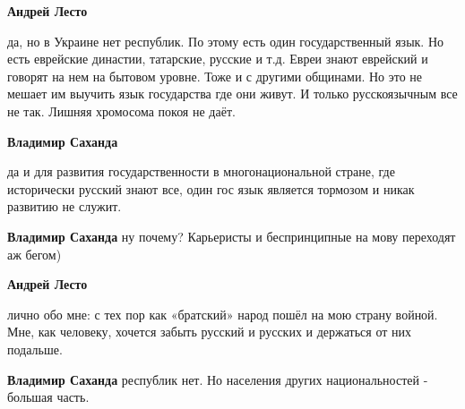 \begin{itemize}
\begin{itemize}
\textbf{Андрей Лесто} 

да, но в Украине нет республик. По этому есть один государственный язык. Но
есть еврейские династии, татарские, русские и т.д. Евреи знают еврейский и
говорят на нем на бытовом уровне. Тоже и с другими общинами. Но это не мешает
им выучить язык государства где они живут. И только русскоязычным все не так.
Лишняя хромосома покоя не даёт.


 
\textbf{Владимир Саханда} 

да и для развития государственности в многонациональной стране, где исторически
русский знают все, один гос язык является тормозом и никак развитию не служит.


 
\textbf{Владимир Саханда} ну почему? Карьеристы и беспринципные на мову переходят аж бегом)

 
\textbf{Андрей Лесто} 

лично обо мне: с тех пор как «братский» народ пошёл на мою страну войной. Мне,
как человеку, хочется забыть русский и русских и держаться от них подальше.

 
\textbf{Владимир Саханда} республик нет. Но населения других национальностей - большая часть.

 

\end{itemize}
\end{itemize}
